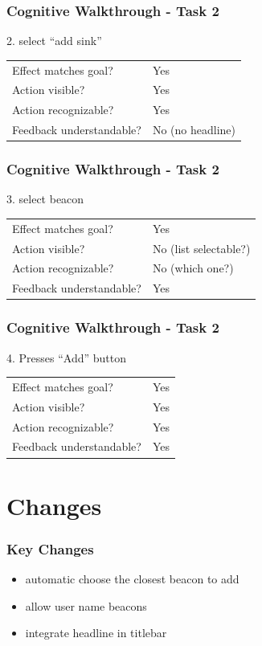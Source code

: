 \documentclass{beamer}
\begin{document}
\begin{frame}
  \frametitle{Cognitive Walkthrough - Task 2}
  2. select ``add sink'' 


  \begin{tabular}{ll}
    Effect matches goal?     & Yes \\
    Action visible?          & Yes \\
    Action recognizable?     & Yes \\
    Feedback understandable? & No (no headline) \\
  \end{tabular}
\end{frame}

\begin{frame}
  \frametitle{Cognitive Walkthrough - Task 2}
  3. select beacon


  \begin{tabular}{ll}
    Effect matches goal?     & Yes \\
    Action visible?          & No (list selectable?) \\
    Action recognizable?     & No (which one?) \\
    Feedback understandable? & Yes \\
  \end{tabular}
\end{frame}

\begin{frame}
  \frametitle{Cognitive Walkthrough - Task 2}
  4. Presses ``Add'' button 


  \begin{tabular}{ll}
    Effect matches goal?     & Yes \\
    Action visible?          & Yes \\
    Action recognizable?     & Yes \\
    Feedback understandable? & Yes \\
  \end{tabular}
\end{frame}




\section{Changes}
\begin{frame}
  \frametitle{Key Changes}
  \begin{itemize}
  \item automatic choose the closest beacon to add
  \item allow user name beacons
  \item integrate headline in titlebar
  \end{itemize}          
\end{frame}
\end{document}
